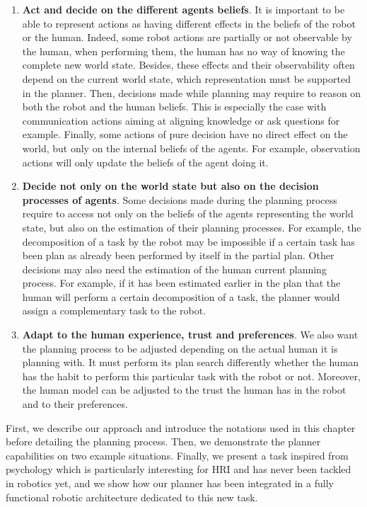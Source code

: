 \documentclass[a4paper,11pt,twoside]{StyleThese}
\begin{document}
\begin{enumerate}
\item \textbf{Act and decide on the different agents beliefs}. It is important to be able to represent actions as having different effects in the beliefs of the robot or the human. Indeed, some robot actions are partially or not observable by the human, when performing them, the human has no way of knowing the complete new world state. Besides, these effects and their observability often depend on the current world state, which representation must be supported in the planner. Then, decisions made while planning may require to reason on both the robot and the human beliefs. This is especially the case with communication actions aiming at aligning knowledge or ask questions for example. Finally, some actions of pure decision have no direct effect on the world, but only on the internal beliefs of the agents. For example, observation actions will only update the beliefs of the agent doing it.

\item \textbf{Decide not only on the world state but also on the decision processes of agents}. Some decisions made during the planning process require to access not only on the beliefs of the agents representing the world state, but also on the estimation of their planning processes. For example, the decomposition of a task by the robot may be impossible if a certain task has been plan as already been performed by itself in the partial plan. Other decisions may also need the estimation of the human current planning process. For example, if it has been estimated earlier in the plan that the human will perform a certain decomposition of a task, the planner would assign a complementary task to the robot.

\item \textbf{Adapt to the human experience, trust and preferences}. We also want the planning process to be adjusted depending on the actual human it is planning with. It must perform its plan search differently whether the human has the habit to perform this particular task with the robot or not. Moreover, the human model can be adjusted to the trust the human has in the robot and to their preferences. 
\end{enumerate}

First, we describe our approach and introduce the notations used in this chapter before detailing the planning process. Then, we demonstrate the planner capabilities on two example situations. Finally, we present a task inspired from psychology which is particularly interesting for HRI and has never been tackled in robotics yet, and we show how our planner has been integrated in a fully functional robotic architecture dedicated to this new task.
\end{document}
